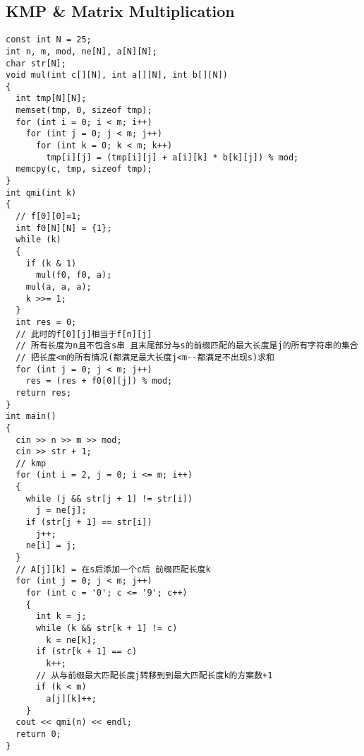 \subsection{KMP \& Matrix Multiplication}
\begin{lstlisting}
const int N = 25;
int n, m, mod, ne[N], a[N][N];
char str[N];
void mul(int c[][N], int a[][N], int b[][N])
{
  int tmp[N][N];
  memset(tmp, 0, sizeof tmp);
  for (int i = 0; i < m; i++)
    for (int j = 0; j < m; j++)
      for (int k = 0; k < m; k++)
        tmp[i][j] = (tmp[i][j] + a[i][k] * b[k][j]) % mod;
  memcpy(c, tmp, sizeof tmp);
}
int qmi(int k)
{
  // f[0][0]=1;
  int f0[N][N] = {1};
  while (k)
  {
    if (k & 1)
      mul(f0, f0, a);
    mul(a, a, a);
    k >>= 1;
  }
  int res = 0;
  // 此时的f[0][j]相当于f[n][j]
  // 所有长度为n且不包含s串 且末尾部分与s的前缀匹配的最大长度是j的所有字符串的集合
  // 把长度<m的所有情况(都满足最大长度j<m--都满足不出现s)求和
  for (int j = 0; j < m; j++)
    res = (res + f0[0][j]) % mod;
  return res;
}
int main()
{
  cin >> n >> m >> mod;
  cin >> str + 1;
  // kmp
  for (int i = 2, j = 0; i <= m; i++)
  {
    while (j && str[j + 1] != str[i])
      j = ne[j];
    if (str[j + 1] == str[i])
      j++;
    ne[i] = j;
  }
  // A[j][k] = 在s后添加一个c后 前缀匹配长度k
  for (int j = 0; j < m; j++)
    for (int c = '0'; c <= '9'; c++)
    {
      int k = j;
      while (k && str[k + 1] != c)
        k = ne[k];
      if (str[k + 1] == c)
        k++;
      // 从与前缀最大匹配长度j转移到到最大匹配长度k的方案数+1
      if (k < m)
        a[j][k]++;
    }
  cout << qmi(n) << endl;
  return 0;
}
\end{lstlisting}